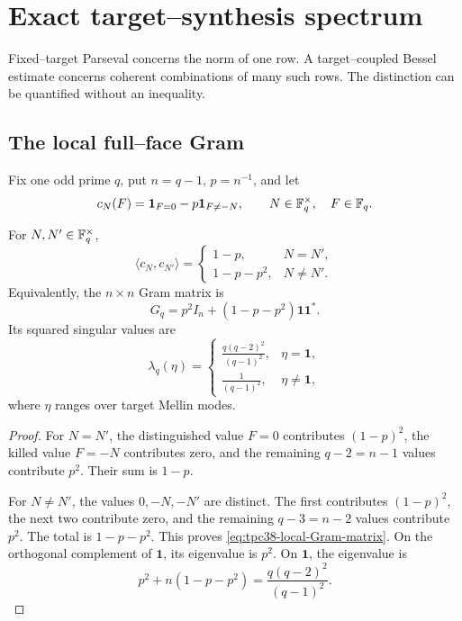 \section{Exact target--synthesis spectrum}
\label{sec:tpc38-target-spectrum}

Fixed--target Parseval concerns the norm of one row.  A target--coupled
Bessel estimate concerns coherent combinations of many such rows.  The
distinction can be quantified without an inequality.

\subsection{The local full--face Gram}

Fix one odd prime \(q\), put \(n=q-1\), \(p=n^{-1}\), and let
\begin{equation}
 c_N(F)=\mathbf 1_{F=0}-p\mathbf 1_{F\ne-N},
 \qquad N\in\mathbb F_q^\times,\quad F\in\mathbb F_q.
 \label{eq:tpc38-local-full-row}
\end{equation}

\begin{lemma}
\label{lem:tpc38-local-target-Gram}
For \(N,N'\in\mathbb F_q^\times\),
\begin{equation}
 \langle c_N,c_{N'}\rangle
 =\begin{cases}
  1-p,&N=N',\\
  1-p-p^2,&N\ne N'.
 \end{cases}
 \label{eq:tpc38-local-target-Gram}
\end{equation}
Equivalently, the \(n\times n\) Gram matrix is
\begin{equation}
 G_q=p^2I_n+(1-p-p^2)\mathbf1\mathbf1^*.
 \label{eq:tpc38-local-Gram-matrix}
\end{equation}
Its squared singular values are
\begin{equation}
 \lambda_q(\eta)=
 \begin{cases}
  \displaystyle\frac{q(q-2)^2}{(q-1)^2},
  &\eta=\mathbf1,\\[0.9em]
  \displaystyle\frac1{(q-1)^2},
  &\eta\ne\mathbf1,
 \end{cases}
 \label{eq:tpc38-local-singular-values}
\end{equation}
where \(\eta\) ranges over target Mellin modes.
\end{lemma}

\begin{proof}
For \(N=N'\), the distinguished value \(F=0\) contributes
\((1-p)^2\), the killed value \(F=-N\) contributes zero, and the remaining
\(q-2=n-1\) values contribute \(p^2\).  Their sum is \(1-p\).

For \(N\ne N'\), the values \(0,-N,-N'\) are distinct.  The first
contributes \((1-p)^2\), the next two contribute zero, and the remaining
\(q-3=n-2\) values contribute \(p^2\).  The total is \(1-p-p^2\).
This proves \eqref{eq:tpc38-local-Gram-matrix}.  On the orthogonal
complement of \(\mathbf1\), its eigenvalue is \(p^2\).  On \(\mathbf1\),
the eigenvalue is
\[
 p^2+n(1-p-p^2)
 =\frac{q(q-2)^2}{(q-1)^2}.
\]
\end{proof}

